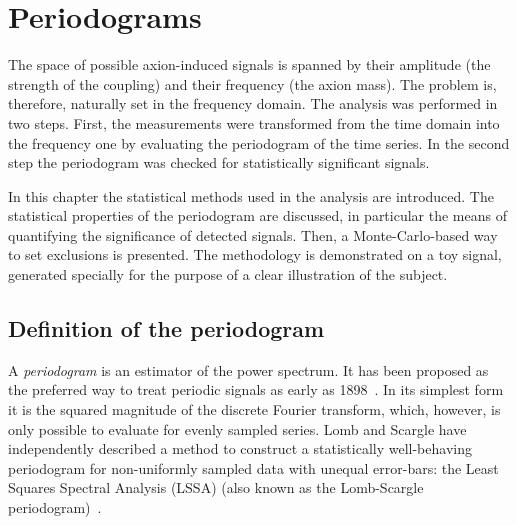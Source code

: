 \chapter{Periodograms}
\label{ch:axions-periodograms}
The space of possible axion-induced signals is spanned by their amplitude (the strength of the coupling) and their frequency (the axion mass).
The problem is, therefore, naturally set in the frequency domain.
The analysis was performed in two steps.
First, the measurements were transformed from the time domain into the frequency one by evaluating the periodogram of the time series.
In the second step the periodogram was checked for statistically significant signals.

In this chapter the statistical methods used in the analysis are introduced.
The statistical properties of the periodogram are discussed, in particular the means of quantifying the significance of detected signals.
Then, a Monte-Carlo-based way to set exclusions is presented.
The methodology is demonstrated on a toy signal, generated specially for the purpose of a clear illustration of the subject.




\section{Definition of the periodogram}
A \emph{periodogram} is an estimator of the power spectrum.
It has been proposed as the preferred way to treat periodic signals as early as 1898~\cite{Schuster1898}.
In its simplest form it is the squared magnitude of the discrete Fourier transform, which, however, is only possible to evaluate for evenly sampled series.
Lomb and Scargle have independently described a method to construct a statistically well-behaving periodogram for non-uniformly sampled data with unequal error-bars: the Least Squares Spectral Analysis (LSSA) (also known as the Lomb-Scargle periodogram)~\cite{Scargle1982}.

